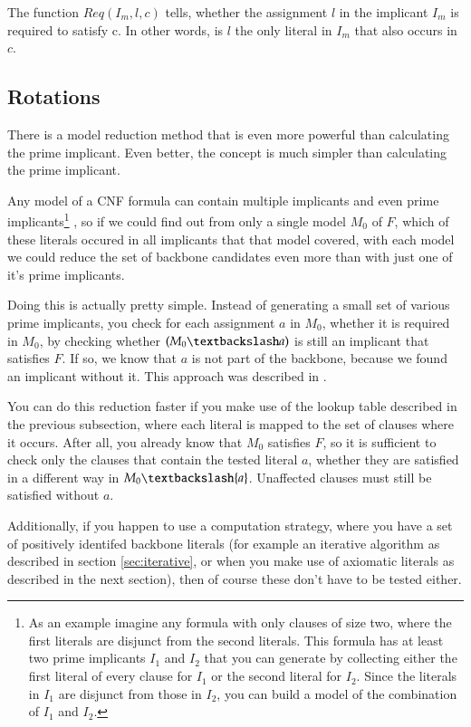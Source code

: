 The function $Req(I_m,l,c)$ tells, whether the assignment $l$ in the implicant $I_m$ is required to satisfy c. In other words, is $l$ the only literal in $I_m$ that also occurs in $c$.

\subsection{Rotations}
\label{ss:rot}
There is a model reduction method that is even more powerful than calculating the prime implicant. Even better, the concept is much simpler than calculating the prime implicant. 

Any model of a CNF formula can contain multiple implicants and even prime implicants\footnote
	{As an example imagine any formula with only clauses of size two, where the first literals are disjunct from the second literals. This formula has at least two prime implicants $I_1$ and $I_2$ that you can generate by collecting either the first literal of every clause for $I_1$ or the second literal for $I_2$. Since the literals in $I_1$ are disjunct from those in $I_2$, you can build a model of the combination of $I_1$ and $I_2$.}
, so if we could find out from only a single model $M_0$ of $F$, which of these literals occured in all implicants that that model covered, with each model we could reduce the set of backbone candidates even more than with just one of it's prime implicants.

Doing this is actually pretty simple. Instead of generating a small set of various prime implicants, you check for each assignment $a$ in $M_0$, whether it is required in $M_0$, by checking whether $(M_0 \textbackslash a)$ is still an implicant that satisfies $F$. If so, we know that $a$ is not part of the backbone, because we found an implicant without it. This approach was described in \cite{mjl15}.

You can do this reduction faster if you make use of the lookup table described in the previous subsection, where each literal is mapped to the set of clauses where it occurs. After all, you already know that $M_0$ satisfies $F$, so it is sufficient to check only the clauses that contain the tested literal $a$, whether they are satisfied in a different way in $M_0 \textbackslash \{a\}$. Unaffected clauses must still be satisfied without $a$.

Additionally, if you happen to use a computation strategy, where you have a set of positively identifed backbone literals (for example an iterative algorithm as described in section \ref{sec:iterative}, or when you make use of axiomatic literals as described in the next section), then of course these don't have to be tested either.

